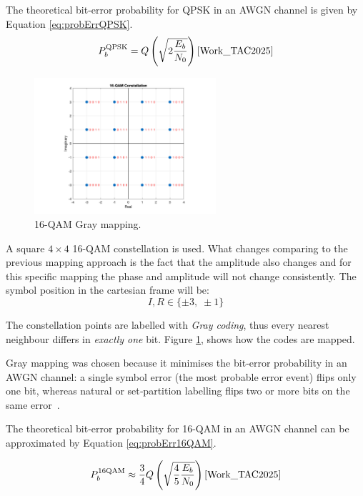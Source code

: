 The theoretical bit-error probability for QPSK in an AWGN channel is given by Equation \ref{eq:probErrQPSK}.
\begin{equation}
  P_b^{\text{QPSK}} = Q\left(\sqrt{2\frac{E_b}{N_0}}\right)\text{\cite{Work_TAC2025}}
  \label{eq:probErrQPSK}
\end{equation}

\begin{figure}[h]
	\centering
	\includegraphics[width=0.6\textwidth]{Images/16-QAM_Constellation.png}
	\caption{16-QAM Gray mapping.}
	\label{fig:QAM_Mapping}
\end{figure}

A square $4\times4$ 16-QAM constellation is used. What changes comparing to the previous mapping approach is the fact that the amplitude also changes and for this specific mapping the phase and amplitude will not change consistently. The symbol position in the cartesian frame will be:
\[
I,R \in \{\pm3,\;\pm1\}
\]

The constellation points are labelled with \emph{Gray coding}, thus every nearest neighbour differs in \emph{exactly one} bit. Figure \ref{fig:QAM_Mapping}, shows how the codes are mapped.

Gray mapping was chosen because it minimises the bit‑error probability in an AWGN channel: a single symbol error (the most probable error event) flips only one bit, whereas natural or set‑partition labelling flips two or more bits on the same error~\cite{Work_TAC2025}.  

The theoretical bit-error probability for 16-QAM in an AWGN channel can be approximated by Equation \ref{eq:probErr16QAM}.

\begin{equation}
  P_b^{\text{16QAM}} \approx \frac{3}{4}Q\left(\sqrt{\frac{4}{5}\frac{E_b}{N_0}}\right)\text{\cite{Work_TAC2025}}
  \label{eq:probErr16QAM}
\end{equation}

